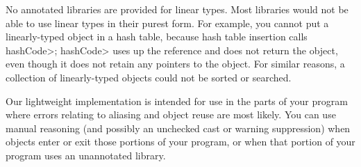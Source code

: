 No annotated libraries are provided for linear types.  Most libraries would
not be able to use linear types in their purest form.  For example, you
cannot put a linearly-typed object in a hash table, because hash table
insertion calls \<hashCode>; \<hashCode> uses up the reference and does not
return the object, even though it does not retain any pointers to the
object.  For similar reasons, a collection of linearly-typed objects could
not be sorted or searched.

Our lightweight implementation is intended for use in the parts of your
program where errors relating to aliasing and object reuse are most likely.
You can use manual reasoning (and possibly an unchecked cast or warning
suppression) when objects enter or exit those portions of your program, or
when that portion of your program uses an unannotated library.


